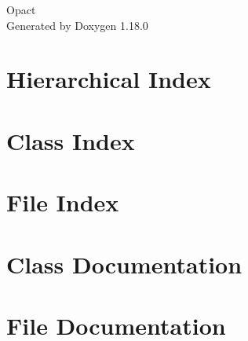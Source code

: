 \documentclass[twoside]{book}
\newcommand{\+}{\discretionary{\mbox{\scriptsize$\hookleftarrow$}}{}{}}
\newcommand{\clearemptydoublepage}{%
    \newpage{\pagestyle{empty}\cleardoublepage}%
  }
\begin{document}
  \raggedbottom
    \hypersetup{pageanchor=false,
                bookmarksnumbered=true,
                pdfencoding=unicode
               }
  \begin{titlepage}
  \vspace*{7cm}
  \begin{center}%
  {\Large Opact}\\
  \vspace*{1cm}
  {\large Generated by Doxygen 1.18.0}\\
  \end{center}
  \end{titlepage}
  \clearemptydoublepage
  \tableofcontents
  \clearemptydoublepage
  \hypersetup{pageanchor=true}
\chapter{Hierarchical Index}

\chapter{Class Index}

\chapter{File Index}

\chapter{Class Documentation}



































\chapter{File Documentation}











  \backmatter
  \newpage
  \clearemptydoublepage
  \printindex
\end{document}

